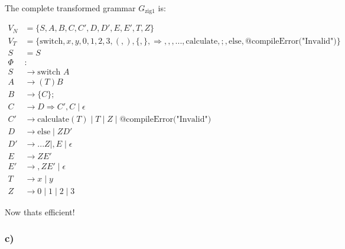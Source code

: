\documentclass[10pt, a4paper]{article}
\begin{document}
  
The complete transformed grammar \( G_{\text{zig1}} \) is:

\[
\begin{align*}
V_N &= \{S, A, B, C, C', D, D', E, E', T, Z\} \\
V_T &= \{\text{switch}, x, y, 0, 1, 2, 3, (, ), \{, \}, \Rightarrow, ,, ..., \text{calculate}, ;, \text{else}, @\text{compileError("Invalid")}\} \\
S &= S \\
\Phi &: \\
S &\rightarrow \text{switch } A \\
A &\rightarrow ( T)B \\
B &\rightarrow \{ C \}; \\
C &\rightarrow D \Rightarrow C' , C \mid \epsilon \\
C' &\rightarrow \text{calculate}(T) \mid T \mid Z \mid @\text{compileError("Invalid")} \\
D &\rightarrow \text{else} \mid Z D' \\
D' &\rightarrow ...Z \mid , E \mid \epsilon \\
E &\rightarrow  ZE' \\
E'&\rightarrow  ,ZE' \mid  \epsilon \\
T &\rightarrow x \mid y \\
Z &\rightarrow 0 \mid 1 \mid 2 \mid 3
\end{align*}
\]

Now thats efficient!

\subsubsection{c)}
\end{document}
